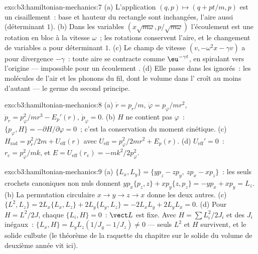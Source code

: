 \begin{solution}{exo:b3:hamiltonian-mechanics:7}
(a) L'application $(q, p) \mapsto (q + pt/m, p)$ est un cisaillement~:
base et hauteur du rectangle sont inchangées, l'aire aussi
(déterminant $1$). (b) Dans les variables $(x\sqrt{m\omega}, p/\sqrt{m\omega})$ l'écoulement
est une rotation en bloc à la vitesse $\omega$~; les rotations
conservent l'aire, et le changement de variables a pour déterminant
$1$. (c) Le champ de vitesse
$(v, -\omega^2x - \gamma v)$ a pour divergence $-\gamma$~: toute aire
se contracte comme $\eu^{-\gamma t}$, en spiralant vers l'origine ---
impossible pour un écoulement . (d) Elle passe dans les
 ignorés~: les molécules de l'air et les phonons du
fil, dont le volume dans l' croît au moins d'autant
--- le germe du second principe.
\end{solution}

\begin{solution}{exo:b3:hamiltonian-mechanics:8}
(a) $\dot r = p_r/m$, $\dot\varphi = p_\varphi/mr^2$, $\dot p_r =
p_\varphi^2/mr^3 - E_p'(r)$, $\dot p_\varphi = 0$. (b) $H$ ne contient pas
$\varphi$~: $\{p_\varphi, H\} = -\partial H/\partial\varphi =
0$~; c'est la conservation du moment cinétique. (c) $H_{\text{rad}} = p_r^2/2m +
U_{\text{eff}}(r)$ avec $U_{\text{eff}} = p_\varphi^2/2mr^2 + E_p(r)$.
(d) $U_{\text{eff}}' = 0$~: $r_{\text{c}} = p_\varphi^2/mk$, et $E =
U_{\text{eff}}(r_{\text{c}}) = -mk^2/2p_\varphi^2$.
\end{solution}

\begin{solution}{exo:b3:hamiltonian-mechanics:9}
(a) $\{L_x, L_y\} = \{yp_z - zp_y,\ zp_x - xp_z\}$~: les seuls
crochets canoniques non nuls donnent $yp_x\{p_z, z\} + xp_y\{z,
p_z\} = -yp_x + xp_y = L_z$. (b) La permutation circulaire $x \to y \to z \to
x$ donne les deux autres. (c) $\{L^2, L_z\} = 2L_x\{L_x, L_z\} +
2L_y\{L_y, L_z\} = -2L_xL_y + 2L_yL_x = 0$. (d) Pour $H = L^2/2J$,
chaque $\{L_i, H\} = 0$~: $\vect L$ est fixe. Avec $H = \sum L_i^2/2J_i$
et des $J_i$ inégaux~: $\{L_x, H\} = L_yL_z(1/J_y - 1/J_z) \neq 0$ ---
seuls $L^2$ et $H$ survivent, et le solide culbute (le théorème de la
raquette du chapitre sur le solide du volume de deuxième année vit ici).
\end{solution}

